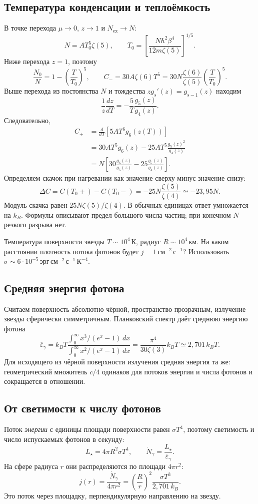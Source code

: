 \documentclass[../final.tex]{subfiles}
\begin{document}
\subsection*{Температура конденсации и теплоёмкость}
В точке перехода $\mu\to0$, $z\to1$ и $N_{\mathrm{ex}}\to N$:
\[
 N=A T_0^5\zeta(5),\qquad
 T_0=\left[\frac{N\hbar^2\beta^4}{12m\zeta(5)}\right]^{1/5}.
\]
Ниже перехода $z=1$, поэтому
\[
 \frac{N_0}{N}=1-\left(\frac{T}{T_0}\right)^5,\qquad
 C_-=30A\zeta(6)T^5
 =30N\frac{\zeta(6)}{\zeta(5)}\left(\frac{T}{T_0}\right)^5.
\]
Выше перехода из постоянства $N$ и тождества
$zg_s'(z)=g_{s-1}(z)$ находим
\[
 \frac1z\frac{dz}{dT}=-\frac5T\frac{g_5(z)}{g_4(z)}.
\]
Следовательно,
\begin{align*}
 C_+&=\frac{d}{dT}\left[5AT^6g_6(z(T))\right]\\
 &=30AT^5g_6(z)-25AT^5\frac{g_5(z)^2}{g_4(z)}\\
 &=N\left[30\frac{g_6(z)}{g_5(z)}
 -25\frac{g_5(z)}{g_4(z)}\right].
\end{align*}
\answer
Определяем скачок при нагревании как значение сверху минус
значение снизу:
\[
 \boxed{\Delta C=C(T_0+)-C(T_0-)
 =-25N\frac{\zeta(5)}{\zeta(4)}\simeq-23{,}95N}.
\]
Модуль скачка равен $25N\zeta(5)/\zeta(4)$.
В обычных единицах ответ умножается на $k_B$.
Формулы описывают предел большого числа частиц; при конечном $N$
резкого разрыва нет.

\clearpage
{}
\condition
Температура поверхности звезды $T\sim10^4\,\text{К}$,
радиус $R\sim10^4\,\text{км}$. На каком расстоянии плотность
потока фотонов будет $j=1\,\text{см}^{-2}\,\text{с}^{-1}$?
Использовать $\sigma\sim6\cdot10^{-5}
\,\text{эрг}\,\text{см}^{-2}\,\text{с}^{-1}\,\text{К}^{-4}$.

\subsection*{Средняя энергия фотона}
Считаем поверхность абсолютно чёрной, пространство прозрачным,
излучение звезды сферически симметричным.
Планковский спектр даёт среднюю энергию фотона
\[
 \overline\varepsilon_\gamma
 =k_BT\frac{\int_0^\infty x^3/(e^x-1)\,dx}
 {\int_0^\infty x^2/(e^x-1)\,dx}
 =\frac{\pi^4}{30\zeta(3)}k_BT
 \simeq2{,}701\,k_BT.
\]
Для исходящего из чёрной поверхности излучения средняя энергия та же:
геометрический множитель $c/4$ одинаков для потоков энергии и числа
фотонов и сокращается в отношении.

\subsection*{От светимости к числу фотонов}
Поток \emph{энергии} с единицы площади поверхности равен
$\sigma T^4$, поэтому светимость и число испускаемых фотонов в секунду:
\[
 L_\star=4\pi R^2\sigma T^4,\qquad
 \dot N_\gamma=\frac{L_\star}{\overline\varepsilon_\gamma}.
\]
На сфере радиуса $r$ они распределяются по площади $4\pi r^2$:
\[
 j(r)=\frac{\dot N_\gamma}{4\pi r^2}
 =\left(\frac Rr\right)^2
 \frac{\sigma T^3}{2{,}701\,k_B}.
\]
Это поток через площадку, перпендикулярную направлению на звезду.
\end{document}
